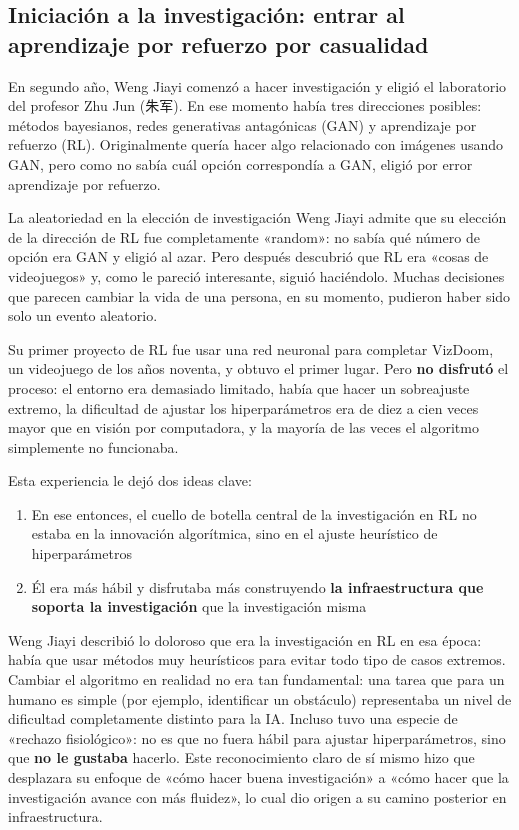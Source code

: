 \subsection{Iniciación a la investigación: entrar al aprendizaje por refuerzo por casualidad}

En segundo año, Weng Jiayi comenzó a hacer investigación y eligió el laboratorio del profesor Zhu Jun (朱军). En ese momento había tres direcciones posibles: métodos bayesianos, redes generativas antagónicas (GAN) y aprendizaje por refuerzo (RL). Originalmente quería hacer algo relacionado con imágenes usando GAN, pero como no sabía cuál opción correspondía a GAN, eligió por error aprendizaje por refuerzo.

\begin{warningbox}{La aleatoriedad en la elección de investigación}
Weng Jiayi admite que su elección de la dirección de RL fue completamente «random»: no sabía qué número de opción era GAN y eligió al azar. Pero después descubrió que RL era «cosas de videojuegos» y, como le pareció interesante, siguió haciéndolo. Muchas decisiones que parecen cambiar la vida de una persona, en su momento, pudieron haber sido solo un evento aleatorio.
\end{warningbox}

Su primer proyecto de RL fue usar una red neuronal para completar VizDoom, un videojuego de los años noventa, y obtuvo el primer lugar. Pero \textbf{no disfrutó} el proceso: el entorno era demasiado limitado, había que hacer un sobreajuste extremo, la dificultad de ajustar los hiperparámetros era de diez a cien veces mayor que en visión por computadora, y la mayoría de las veces el algoritmo simplemente no funcionaba.

Esta experiencia le dejó dos ideas clave:
\begin{enumerate}
    \item En ese entonces, el cuello de botella central de la investigación en RL no estaba en la innovación algorítmica, sino en el ajuste heurístico de hiperparámetros
    \item Él era más hábil y disfrutaba más construyendo \textbf{la infraestructura que soporta la investigación} que la investigación misma
\end{enumerate}

Weng Jiayi describió lo doloroso que era la investigación en RL en esa época: había que usar métodos muy heurísticos para evitar todo tipo de casos extremos. Cambiar el algoritmo en realidad no era tan fundamental: una tarea que para un humano es simple (por ejemplo, identificar un obstáculo) representaba un nivel de dificultad completamente distinto para la IA. Incluso tuvo una especie de «rechazo fisiológico»: no es que no fuera hábil para ajustar hiperparámetros, sino que \textbf{no le gustaba} hacerlo. Este reconocimiento claro de sí mismo hizo que desplazara su enfoque de «cómo hacer buena investigación» a «cómo hacer que la investigación avance con más fluidez», lo cual dio origen a su camino posterior en infraestructura.

